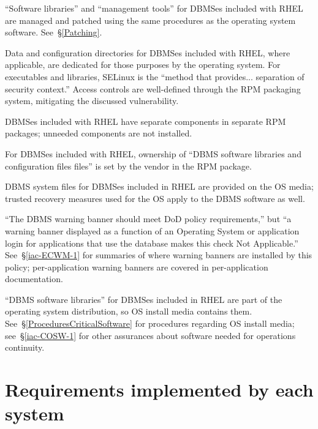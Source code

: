 %
``Software libraries'' and ``management tools'' for DBMSes included with
RHEL are managed and patched using the same procedures as the operating
system software. See~\S\ref{Patching}.

%
Data and configuration directories for DBMSes included with RHEL, where
applicable, are dedicated for those purposes by the operating system.
For executables and libraries, SELinux is the ``method that provides...
separation of security context.'' Access controls are well-defined through
the RPM packaging system, mitigating the discussed vulnerability.

%
DBMSes included with RHEL have separate components in separate RPM
packages; unneeded components are not installed.

%
For DBMSes included with RHEL, ownership of ``DBMS software libraries and
configuration files files'' is set by the vendor in the RPM package.

%
DBMS system files for DBMSes included in RHEL are provided on the OS
media; trusted recovery measures used for the OS apply to the DBMS
software as well.

%
``The DBMS warning banner should meet DoD policy requirements,'' but ``a
warning banner displayed as a function of an Operating System or
application login for applications that use the database makes this check
Not Applicable.'' See~\S\ref{iac-ECWM-1} for summaries of where warning
banners are installed by this policy; per-application warning banners are
covered in per-application documentation.

%
``DBMS software libraries'' for DBMSes included in RHEL are part of the
operating system distribution, so OS install media contains them.
See~\S\ref{ProceduresCriticalSoftware} for procedures regarding OS install
media; see~\S\ref{iac-COSW-1} for other assurances about software needed
for operations continuity.






\section{Requirements implemented by each system}
\label{per-system-databasestig}

